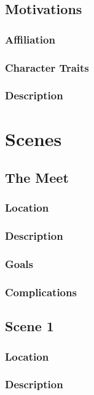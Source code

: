 \documentclass{ShadowTeXSR5}
\begin{document}
\subsection{Motivations}
\lipsum[1]
\subsubsection{Affiliation}
\lipsum[1]
\subsubsection{Character Traits}
\lipsum[1]
\subsubsection{Description}
\lipsum[1]

\section{Scenes}
\lipsum[1]
\subsection{The Meet}
\lipsum[1]
\subsubsection{Location}
\lipsum[1]
\subsubsection{Description}
\lipsum[1]
\subsubsection{Goals}
\lipsum[1]
\subsubsection{Complications}
\lipsum[1]

\subsection{Scene 1}
\lipsum[1]
\subsubsection{Location}
\lipsum[1]
\subsubsection{Description}
\lipsum[1]
\end{document}

